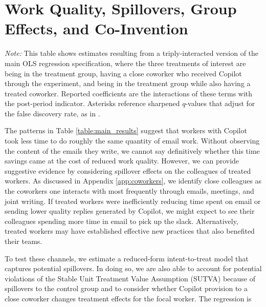 \documentclass{article}
\newenvironment{tablenotes}{
    \begin{flushleft} \small
    \textit{Note:} 
}{
    \end{flushleft}
}
\begin{document}
\section{Work Quality, Spillovers, Group Effects, and Co-Invention} 



\begin{table}[htbp]
  \caption{Spillover Effects of Copilot} 
    \label{table:spillover_table}    
    \begin{tablenotes}This table shows estimates resulting from a triply-interacted version of the main OLS regression specification, where the three treatments of interest are being in the treatment group, having a close coworker who received Copilot through the experiment, and being in the treatment group while also having a treated coworker. Reported coefficients are the interactions of these terms with the post-period indicator. Asterisks reference sharpened $q$-values that adjust for the false discovery rate, as in \citet{anderson2008multiple}.
    \end{tablenotes}
\end{table}


The patterns in Table \ref{table:main_results} suggest that workers with Copilot took less time to do roughly the same quantity of email work. Without observing the content of the emails they write, we cannot say definitively whether this time savings came at the cost of reduced work quality. However, we can provide suggestive evidence by considering spillover effects on the colleagues of treated workers.
As discussed in Appendix \ref{app:coworkers}, we identify close colleagues as the coworkers one interacts with most frequently through emails, meetings, and joint writing. If treated workers were inefficiently reducing time spent on email or sending lower quality replies generated by Copilot, we might expect to see their colleagues spending more time in email to pick up the slack. Alternatively, treated workers may have established effective new practices that also benefited their teams. 

To test these channels, we estimate a reduced-form intent-to-treat model that captures potential spillovers.  In doing so, we are also able to account for potential violations of the Stable Unit Treatment Value Assumption (SUTVA) because of spillovers to the control group and to consider whether Copilot provision to a close coworker changes treatment effects for the focal worker.  The regression is
\end{document}
